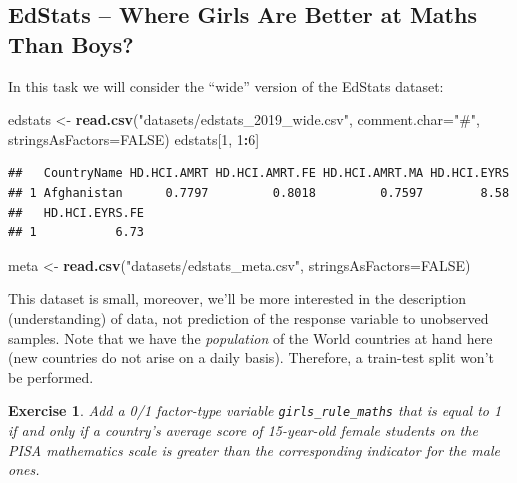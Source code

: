 \documentclass[10pt,b5paper,krantz1]{krantz}
\newenvironment{Shaded}{\begin{snugshade}}{\end{snugshade}}
\newcommand{\DataTypeTok}[1]{\textcolor[rgb]{0.27,0.27,0.27}{#1}}
\newcommand{\DecValTok}[1]{\textcolor[rgb]{0.06,0.06,0.06}{#1}}
\newcommand{\KeywordTok}[1]{\textcolor[rgb]{0.27,0.27,0.27}{\textbf{#1}}}
\newcommand{\NormalTok}[1]{#1}
\newcommand{\OperatorTok}[1]{\textcolor[rgb]{0.43,0.43,0.43}{\textbf{#1}}}
\newcommand{\OtherTok}[1]{\textcolor[rgb]{0.37,0.37,0.37}{#1}}
\newcommand{\StringTok}[1]{\textcolor[rgb]{0.5,0.5,0.5}{#1}}
\newtheorem{exercise}{Exercise}[chapter]
\begin{document}
\hypertarget{edstats-where-girls-are-better-at-maths-than-boys}{%
\subsection{EdStats -- Where Girls Are Better at Maths Than Boys?}\label{edstats-where-girls-are-better-at-maths-than-boys}}

In this task we will consider the ``wide'' version of the EdStats
dataset:

\begin{Shaded}
\begin{Highlighting}[]
\NormalTok{edstats <-}\StringTok{ }\KeywordTok{read.csv}\NormalTok{(}\StringTok{"datasets/edstats_2019_wide.csv"}\NormalTok{,}
    \DataTypeTok{comment.char=}\StringTok{"#"}\NormalTok{, }\DataTypeTok{stringsAsFactors=}\OtherTok{FALSE}\NormalTok{)}
\NormalTok{edstats[}\DecValTok{1}\NormalTok{, }\DecValTok{1}\OperatorTok{:}\DecValTok{6}\NormalTok{]}
\end{Highlighting}
\end{Shaded}

\begin{verbatim}
##   CountryName HD.HCI.AMRT HD.HCI.AMRT.FE HD.HCI.AMRT.MA HD.HCI.EYRS
## 1 Afghanistan      0.7797         0.8018         0.7597        8.58
##   HD.HCI.EYRS.FE
## 1           6.73
\end{verbatim}

\begin{Shaded}
\begin{Highlighting}[]
\NormalTok{meta <-}\StringTok{ }\KeywordTok{read.csv}\NormalTok{(}\StringTok{"datasets/edstats_meta.csv"}\NormalTok{,}
    \DataTypeTok{stringsAsFactors=}\OtherTok{FALSE}\NormalTok{)}
\end{Highlighting}
\end{Shaded}

This dataset is small, moreover, we'll be more interested in the description
(understanding) of data, not prediction of the response variable
to unobserved samples. Note that we have the \emph{population} of the World
countries at hand here (new countries do not arise on a daily basis).
Therefore, a train-test split won't be performed.

\begin{exercise}

Add a 0/1 factor-type variable \texttt{girls\_rule\_maths} that is equal to 1
if and only if a country's average score of 15-year-old female students on the PISA
mathematics scale is greater than the corresponding indicator for the male ones.

\end{exercise}
\end{document}
